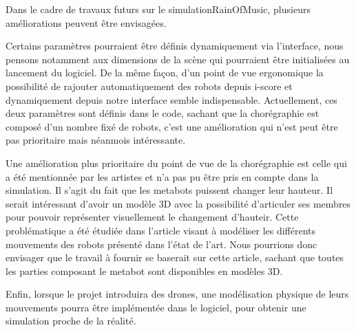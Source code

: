 Dans le cadre de travaux futurs sur le simulationRainOfMusic, plusieurs améliorations peuvent être envisagées.

Certains paramètres pourraient être définis dynamiquement via l'interface, nous pensons notamment aux dimensions de la scène qui pourraient être initialisées au lancement du logiciel. De la même façon, d'un point de vue ergonomique la possibilité de rajouter automatiquement des robots depuis i-score et dynamiquement depuis notre interface semble indispensable. Actuellement, ces deux paramètres sont définis dans le code, sachant que la chorégraphie est composé d'un nombre fixé de robots, c'est une amélioration qui n'est peut être pas prioritaire mais néanmois intéressante.

Une amélioration plus prioritaire du point de vue de la chorégraphie est celle qui a été mentionnée par les artistes et n'a pas pu être pris en compte dans la simulation. Il s'agit du fait que les metabots puissent changer leur hauteur. Il serait intéressant d'avoir un modèle 3D avec la possibilité d'articuler ses membres pour pouvoir représenter visuellement le changement d'hauteir. Cette problématique a été étudiée dans l'article visant à modéliser les différents mouvements des robots \cite{robotArt} présenté dans l'état de l'art. Nous pourrions donc envisager que le travail à fournir se baserait sur cette article, sachant que toutes les parties composant le metabot sont disponibles en modèles 3D.

Enfin, lorsque le projet introduira des drones, une modélisation physique de leurs mouvements pourra être implémentée dans le logiciel, pour obtenir une simulation proche de la réalité.

